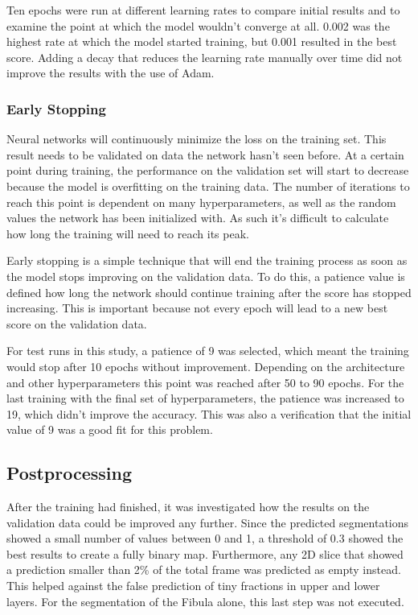 \newpage

Ten epochs were run at different learning rates to compare initial results and to examine the point at which the model wouldn't converge at all. 0.002 was the highest rate at which the model started training, but 0.001 resulted in the best score. Adding a decay that reduces the learning rate manually over time did not improve the results with the use of Adam.

\subsubsection{Early Stopping}

Neural networks will continuously minimize the loss on the training set. This result needs to be validated on data the network hasn't seen before. At a certain point during training, the performance on the validation set will start to decrease because the model is overfitting on the training data. The number of iterations to reach this point is dependent on many hyperparameters, as well as the random values the network has been initialized with. As such it's difficult to calculate how long the training will need to reach its peak.

Early stopping is a simple technique that will end the training process as soon as the model stops improving on the validation data. To do this, a patience value is defined how long the network should continue training after the score has stopped increasing. This is important because not every epoch will lead to a new best score on the validation data.

For test runs in this study, a patience of 9 was selected, which meant the training would stop after 10 epochs without improvement. Depending on the architecture and other hyperparameters this point was reached after 50 to 90 epochs. For the last training with the final set of hyperparameters, the patience was increased to 19, which didn't improve the accuracy.  This was also a verification that the initial value of 9 was a good fit for this problem.

\subsection{Postprocessing}

After the training had finished, it was investigated how the results on the validation data could be improved any further. Since the predicted segmentations showed a small number of values between 0 and 1, a threshold of 0.3 showed the best results to create a fully binary map. Furthermore, any 2D slice that showed a prediction smaller than 2\% of the total frame was predicted as empty instead. This helped against the false prediction of tiny fractions in upper and lower layers. For the segmentation of the Fibula alone, this last step was not executed.

